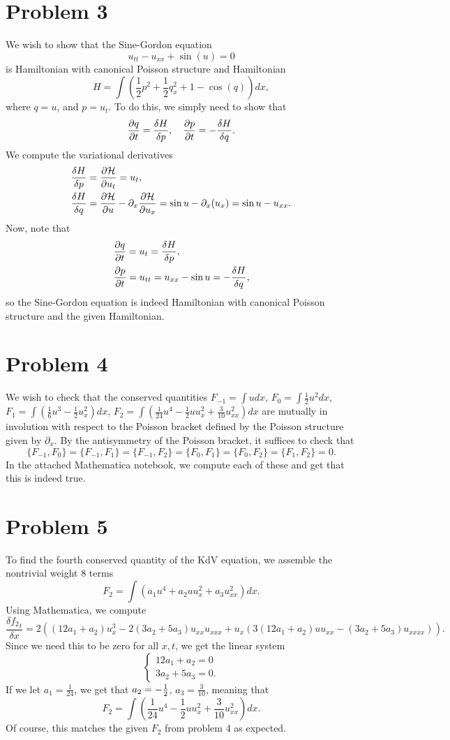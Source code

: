 \documentclass{article}
\begin{document}
\section{Problem 3}
We wish to show that the Sine-Gordon equation
$$
u_{tt}-u_{xx}+\sin(u)=0
$$
is Hamiltonian with canonical Poisson structure and Hamiltonian
$$
H=\int \left(\frac{1}{2} p^2+\frac{1}{2}q_{x}^2+1-\cos(q)\right)dx,
$$
where $q=u$, and $p=u_t$. To do this, we simply need to show that 
\[
\frac{\partial q}{\partial t}=\frac{\delta H}{\delta p},\quad\frac{\partial p}{\partial t}=-\frac{\delta H}{\delta q}.
\]
We compute the variational derivatives
\begin{align*}
&\frac{\delta H}{\delta p}=\frac{\partial \mathcal H}{\partial u_t}=u_t,\\
&\frac{\delta H}{\delta q}=\frac{\partial \mathcal H}{\partial u}-\partial_x\frac{\partial \mathcal H}{\partial u_x}=\sin u-\partial_x(u_x)=\sin u-u_{xx}.
\end{align*}
Now, note that
\begin{align*}
&\frac{\partial q}{\partial t}=u_t=\frac{\delta H}{\delta p},\\
&\frac{\partial p}{\partial t}=u_{tt}=u_{xx}-\sin u=-\frac{\delta H}{\delta q},
\end{align*}
so the Sine-Gordon equation is indeed Hamiltonian with canonical Poisson structure and the given Hamiltonian. 

\section{Problem 4}
We wish to check that the conserved quantities $F_{-1}=\int u dx$,
$F_0=\int \frac{1}{2} u^2 dx$,
$F_1=\int\left(\frac{1}{6}u^3-\frac{1}{2}u_x^2\right) dx$, $F_2=\int
\left(\frac{1}{24}u^4-\frac{1}{2}uu_x^2+\frac{3}{10}u_{xx}^2\right)dx$ are
mutually in involution with respect to the Poisson bracket defined by the
Poisson structure given by $\partial_x$. By the antisymmetry of the Poisson bracket, it suffices to check that 
\[
\{F_{-1},F_0\}=\{F_{-1},F_1\}=\{F_{-1},F_2\}=\{F_{0},F_1\}=\{F_{0},F_2\}=\{F_{1},F_2\}=0. 
\]
In the attached Mathematica notebook, we compute each of these and get that this is indeed true.

\section{Problem 5}
To find the fourth conserved quantity of the KdV equation, we assemble the nontrivial weight 8 terms
\[
F_2=\int (a_1u^4+a_2uu_x^2+a_3u_{xx}^2)dx.
\]
Using Mathematica, we compute
\[
\frac{\delta {f_2}_t}{\delta x}=2((12a_1+a_2)u_x^3-2(3a_2+5a_3)u_{xx}u_{xxx}+u_x(3(12a_1+a_2)uu_{xx}-(3a_2+5a_3)u_{xxxx})).
\]
Since we need this to be zero for all $x,t$, we get the linear system
\[
\begin{cases}
12a_1+a_2=0\\
3a_2+5a_3=0.
\end{cases}
\]
If we let $a_1=\frac{1}{24}$, we get that $a_2=-\mbox{$\frac{1}{2}$}$, $a_3=\frac{3}{10}$, meaning that 
\[
F_2=\int
\left(\frac{1}{24}u^4-\frac{1}{2}uu_x^2+\frac{3}{10}u_{xx}^2\right)dx.
\]
Of course, this matches the given $F_2$ from problem 4 as expected.
\end{document}
